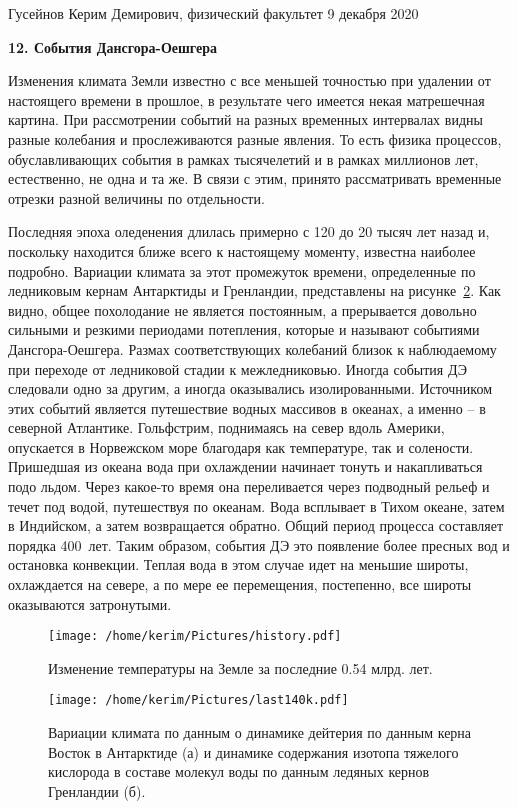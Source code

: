 \documentclass[a4paper, 12pt]{article}
\begin{document}
\noindent
Гусейнов Керим Демирович, физический факультет
\hfill
9 декабря 2020

\begin{center}
	\textbf{12. События Дансгора-Оешгера}
\end{center}

Изменения климата Земли известно с все меньшей точностью при удалении 
от настоящего времени в прошлое, в результате чего имеется некая 
матрешечная картина. При рассмотрении событий на разных временных 
интервалах видны разные колебания и прослеживаются разные явления. То 
есть физика процессов, обуславливающих события в рамках тысячелетий 
и в рамках миллионов лет, естественно, не одна и та же. В связи с этим, 
принято рассматривать временные отрезки разной величины по отдельности.

Последняя эпоха оледенения длилась примерно с 120 до 20 тысяч лет 
назад и, поскольку находится ближе всего к настоящему моменту, 
известна наиболее подробно. Вариации климата за этот промежуток 
времени, определенные по ледниковым кернам Антарктиды и Гренландии, 
представлены на рисунке~\ref{fig:last}. Как видно, общее похолодание 
не является постоянным, а прерывается довольно сильными и резкими 
периодами потепления, которые и называют событиями Дансгора-Оешгера. 
Размах соответствующих колебаний близок к наблюдаемому при переходе 
от ледниковой стадии к межледниковью. Иногда события ДЭ следовали 
одно за другим, а иногда оказывались изолированными. Источником этих 
событий является путешествие водных массивов в океанах, а именно -- 
в северной Атлантике. Гольфстрим, поднимаясь на север вдоль Америки, 
опускается в Норвежском море благодаря как температуре, так 
и солености. Пришедшая из океана вода при охлаждении начинает тонуть 
и накапливаться подо льдом. Через какое-то время она переливается 
через подводный рельеф и течет под водой, путешествуя по океанам. 
Вода всплывает в Тихом океане, затем в Индийском, а затем 
возвращается обратно. Общий период процесса составляет порядка 
400~лет. Таким образом, события ДЭ это появление более пресных вод 
и остановка конвекции. Теплая вода в этом случае идет на меньшие 
широты, охлаждается на севере, а по мере ее перемещения, постепенно, 
все широты оказываются затронутыми.

\begin{figure}[b!]
	\texttt{[image: /home/kerim/Pictures/history.pdf]}
	\baselineskip
	\caption{Изменение температуры на Земле за последние 0.54 млрд. лет.}
	\label{fig:history}
\end{figure}

\begin{figure}[b!]
	\texttt{[image: /home/kerim/Pictures/last140k.pdf]}
	\caption{Вариации климата по данным о динамике дейтерия по данным 
	керна Восток в Антарктиде (а) и динамике содержания изотопа 
	тяжелого кислорода в составе молекул воды по данным ледяных кернов 
	Гренландии (б).}
	\label{fig:last}
\end{figure}
\end{document}
